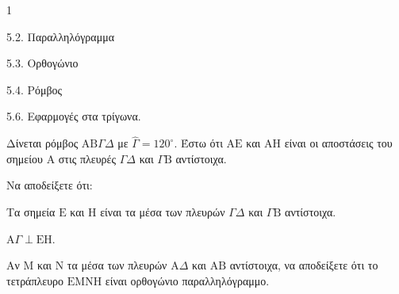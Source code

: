 \begin{ylh}{1}
    \item 5.2. Παραλληλόγραμμα
    \item 5.3. Ορθογώνιο
    \item 5.4. Ρόμβος
    \item 5.6. Εφαρμογές στα τρίγωνα.
\end{ylh}
Δίνεται ρόμβος $\mathrm{A}\mathrm{B}\Gamma\Delta$ με $\hat{\Gamma} = 120^\circ$. Έστω ότι $\mathrm{A}\mathrm{E}$ και $\mathrm{A}\mathrm{H}$ είναι οι αποστάσεις του σημείου $\mathrm{A}$ στις πλευρές $\Gamma\Delta$ και $\Gamma\mathrm{B}$ αντίστοιχα.
\begin{alist}
    \item Να αποδείξετε ότι:
    \begin{rlist}
        \item Τα σημεία $\mathrm{E}$ και $\mathrm{H}$ είναι τα μέσα των πλευρών $\Gamma\Delta$ και $\Gamma\mathrm{B}$ αντίστοιχα. 
        \item $\mathrm{A}\Gamma \perp \mathrm{E}\mathrm{H}$. 
    \end{rlist}
    \item Αν $\mathrm{M}$ και $\mathrm{N}$ τα μέσα των πλευρών $\mathrm{A}\Delta$ και $\mathrm{A}\mathrm{B}$ αντίστοιχα, να αποδείξετε ότι το τετράπλευρο $\mathrm{E}\mathrm{M}\mathrm{N}\mathrm{H}$ είναι ορθογώνιο παραλληλόγραμμο. 
\end{alist}
